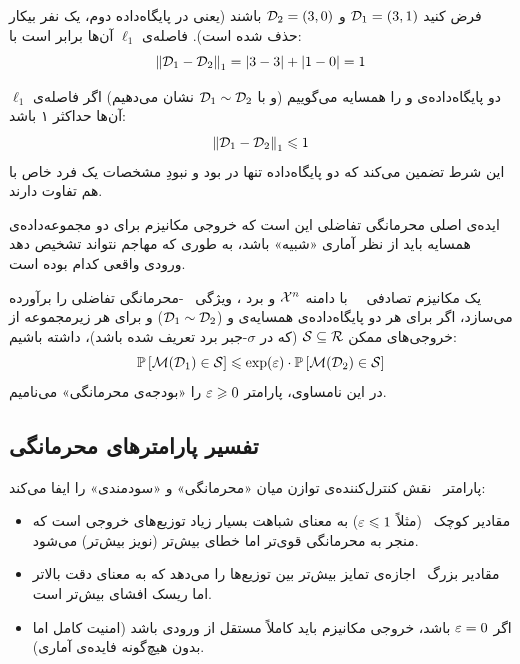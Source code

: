 \begin{مثال}
فرض کنید $\Dset[1] = (3, 1)$ و $\Dset[2] = (3, 0)$ باشند (یعنی در پایگاه‌داده دوم، یک نفر بیکار حذف شده است). فاصله‌ی $\ell_1$ آن‌ها برابر است با:
\[
\left\| \Dset[1] - \Dset[2] \right\|_1 = |3-3| + |1-0| = 1
\]
\end{مثال}

\begin{تعریف}
\label{def:adjacent-datasets}
دو پایگاه‌داده‌ی \Dset[1] و \Dset[2] را همسایه می‌گوییم (و با $\Dset[1] \sim \Dset[2]$ نشان می‌دهیم) اگر فاصله‌ی $\ell_1$ آن‌ها حداکثر ۱ باشد:
\[
\left\| \Dset[1]-\Dset[2] \right\|_1 \leq 1
\]
این شرط تضمین می‌کند که دو پایگاه‌داده تنها در بود و نبودِ مشخصات یک فرد خاص با هم تفاوت دارند.
\end{تعریف}



ایده‌ی اصلی محرمانگی تفاضلی این است که خروجی مکانیزم برای دو مجموعه‌داده‌ی همسایه باید از نظر آماری «شبیه» باشد، به طوری که مهاجم نتواند تشخیص دهد ورودی واقعی کدام بوده است.

\begin{تعریف}
\label{def:cdp}
یک مکانیزم تصادفی \ \mech \ با دامنه $\Xset^n$ و برد \Rset، ویژگی \ \eps-محرمانگی تفاضلی را برآورده می‌سازد، اگر برای هر دو پایگاه‌داده‌ی همسایه‌ی \Dset[1] و \Dset[2] ($\Dset[1] \sim \Dset[2]$) و برای هر زیرمجموعه از خروجی‌های ممکن $\Sset \subseteq \Rset$ (که در $\sigma$-جبر برد تعریف شده باشد)، داشته باشیم:
\begin{equation}
\label{eq:cdp}
\mathbb{P}\left[ \mech(\Dset[1]) \in \Sset \right] \le \exp(\eps) \cdot \mathbb{P}\left[ \mech(\Dset[2]) \in \Sset \right]
\end{equation}
در این نامساوی، پارامتر $\varepsilon \geqslant 0$ را «بودجه‌ی محرمانگی» می‌نامیم.
\end{تعریف}



\subsection{تفسیر پارامترهای محرمانگی}
پارامتر \eps\ نقش کنترل‌کننده‌ی توازن میان «محرمانگی» و «سودمندی» را ایفا می‌کند:
\begin{itemize}
    \item مقادیر کوچک \eps\ (مثلاً $\varepsilon \leqslant 1$) به معنای شباهت بسیار زیاد توزیع‌های خروجی است که منجر به محرمانگی قوی‌تر اما خطای بیش‌تر (نویز بیش‌تر) می‌شود.
    \item مقادیر بزرگ \eps\ اجازه‌ی تمایز بیش‌تر بین توزیع‌ها را می‌دهد که به معنای دقت بالاتر اما ریسک افشای بیش‌تر است.
    \item اگر $\varepsilon=0$ باشد، خروجی مکانیزم باید کاملاً مستقل از ورودی باشد (امنیت کامل اما بدون هیچ‌گونه فایده‌ی آماری).
\end{itemize}

